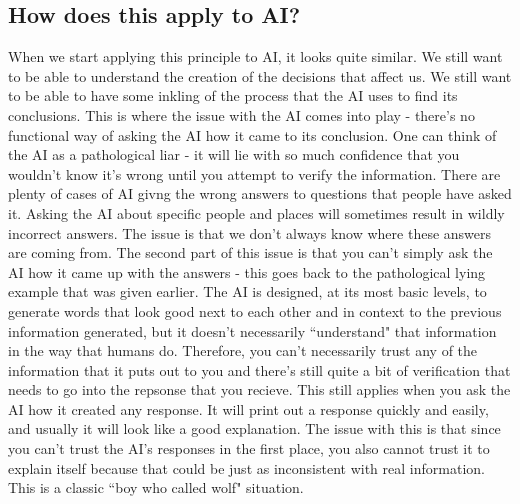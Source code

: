 \documentclass[12pt]{article}
\begin{document}
    \subsection{How does this apply to AI?}
    When we start applying this principle to AI, it looks quite similar. We still want to be able
    to understand the creation of the decisions that affect us. We still want to be able to have
    some inkling of the process that the AI uses to find its conclusions. This is where the issue
    with the AI comes into play - there's no functional way of asking the AI how it came to its
    conclusion. One can think of the AI as a pathological liar - it will lie with so much confidence
    that you wouldn't know it's wrong until you attempt to verify the information. There are plenty
    of cases of AI givng the wrong answers to questions that people have asked it. Asking the AI 
    about specific people and places will sometimes result in wildly incorrect answers.
    The issue is that we don't always know where these answers are coming from. The
    second part of this issue is that you can't simply ask the AI how it came up with the answers - 
    this goes back to the pathological lying example that was given earlier. The AI is designed,
    at its most basic levels, to generate words that look good next to each other and in context
    to the previous information generated, but it doesn't necessarily ``understand" that information
    in the way that humans do. Therefore, you can't necessarily trust any of the information that
    it puts out to you and there's still quite a bit of verification that needs to go into the repsonse
    that you recieve. This still applies when you ask the AI how it created any response. It will
    print out a response quickly and easily, and usually it will look like a good explanation.
    The issue with this is that since you can't trust the AI's responses in the first place,
    you also cannot trust it to explain itself because that could be just as inconsistent with 
    real information. This is a classic ``boy who called wolf" situation.
\end{document}
